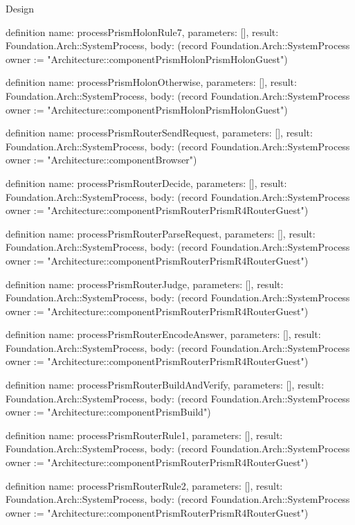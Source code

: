 \begin{lexlean}{Design}
\begin{semanticmodule}
definition{
  name: processPrismHolonRule7,
  parameters: [],
  result: Foundation.Arch::SystemProcess,
  body: (record Foundation.Arch::SystemProcess {owner := "Architecture::componentPrismHolonPrismHolonGuest"})
}

definition{
  name: processPrismHolonOtherwise,
  parameters: [],
  result: Foundation.Arch::SystemProcess,
  body: (record Foundation.Arch::SystemProcess {owner := "Architecture::componentPrismHolonPrismHolonGuest"})
}

definition{
  name: processPrismRouterSendRequest,
  parameters: [],
  result: Foundation.Arch::SystemProcess,
  body: (record Foundation.Arch::SystemProcess {owner := "Architecture::componentBrowser"})
}

definition{
  name: processPrismRouterDecide,
  parameters: [],
  result: Foundation.Arch::SystemProcess,
  body: (record Foundation.Arch::SystemProcess {owner := "Architecture::componentPrismRouterPrismR4RouterGuest"})
}

definition{
  name: processPrismRouterParseRequest,
  parameters: [],
  result: Foundation.Arch::SystemProcess,
  body: (record Foundation.Arch::SystemProcess {owner := "Architecture::componentPrismRouterPrismR4RouterGuest"})
}

definition{
  name: processPrismRouterJudge,
  parameters: [],
  result: Foundation.Arch::SystemProcess,
  body: (record Foundation.Arch::SystemProcess {owner := "Architecture::componentPrismRouterPrismR4RouterGuest"})
}

definition{
  name: processPrismRouterEncodeAnswer,
  parameters: [],
  result: Foundation.Arch::SystemProcess,
  body: (record Foundation.Arch::SystemProcess {owner := "Architecture::componentPrismRouterPrismR4RouterGuest"})
}

definition{
  name: processPrismRouterBuildAndVerify,
  parameters: [],
  result: Foundation.Arch::SystemProcess,
  body: (record Foundation.Arch::SystemProcess {owner := "Architecture::componentPrismBuild"})
}

definition{
  name: processPrismRouterRule1,
  parameters: [],
  result: Foundation.Arch::SystemProcess,
  body: (record Foundation.Arch::SystemProcess {owner := "Architecture::componentPrismRouterPrismR4RouterGuest"})
}

definition{
  name: processPrismRouterRule2,
  parameters: [],
  result: Foundation.Arch::SystemProcess,
  body: (record Foundation.Arch::SystemProcess {owner := "Architecture::componentPrismRouterPrismR4RouterGuest"})
}


\end{semanticmodule}
\end{lexlean}
